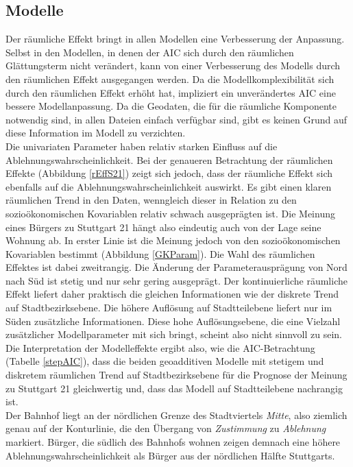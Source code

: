\documentclass{Vorlage}
\begin{document}
\subsection{Modelle}
Der räumliche Effekt bringt in allen Modellen eine Verbesserung der Anpassung. Selbst in den Modellen, in denen der AIC sich durch den räumlichen Glättungsterm nicht verändert, kann von einer Verbesserung des Modells durch den räumlichen Effekt ausgegangen werden. Da die Modellkomplexibilität sich durch den räumlichen Effekt erhöht hat, impliziert ein unverändertes AIC eine bessere Modellanpassung. Da die Geodaten, die für die räumliche Komponente notwendig sind, in allen Dateien einfach verfügbar sind, gibt es keinen Grund auf diese Information im Modell zu verzichten.\\
Die univariaten Parameter haben relativ starken Einfluss auf die Ablehnungswahrscheinlichkeit. Bei der genaueren Betrachtung der räumlichen Effekte (Abbildung \ref{rEffS21}) zeigt sich jedoch, dass der räumliche Effekt sich ebenfalls auf die Ablehnungswahrscheinlichkeit auswirkt. Es gibt einen klaren räumlichen Trend in den Daten, wenngleich dieser in Relation zu den sozioökonomischen Kovariablen relativ schwach ausgeprägten ist. Die Meinung eines Bürgers zu Stuttgart 21 hängt also eindeutig auch von der Lage seine Wohnung ab. In erster Linie ist die Meinung jedoch von den sozioökonomischen Kovariablen bestimmt (Abbildung \ref{GKParam}). Die Wahl des räumlichen Effektes ist dabei zweitrangig. Die Änderung der Parameterausprägung von Nord nach Süd ist stetig und nur sehr gering ausgeprägt. Der kontinuierliche räumliche Effekt liefert daher praktisch die gleichen Informationen wie der diskrete Trend auf Stadtbezirksebene. Die höhere Auflösung auf Stadtteilebene liefert nur im Süden zusätzliche Informationen. Diese hohe Auflösungsebene, die eine Vielzahl zusätzlicher Modellparameter mit sich bringt, scheint also nicht sinnvoll zu sein. Die Interpretation der Modelleffekte ergibt also, wie die AIC-Betrachtung (Tabelle \ref{stepAIC}), dass die beiden geoadditiven Modelle mit stetigem und diskretem räumlichen Trend auf Stadtbezirksebene für die Prognose der Meinung zu Stuttgart 21 gleichwertig und, dass das Modell auf Stadtteilebene nachrangig ist.\\
Der Bahnhof liegt an der nördlichen Grenze des Stadtviertels \textit{Mitte}, also ziemlich genau auf der Konturlinie, die den Übergang von \textit{Zustimmung} zu \textit{Ablehnung} markiert. Bürger, die südlich des Bahnhofs wohnen zeigen demnach eine höhere Ablehnungswahrscheinlichkeit als Bürger aus der nördlichen Hälfte Stuttgarts.\\
\end{document}
